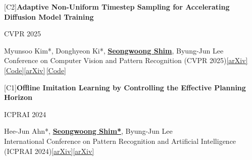 \documentclass[10.5pt,a4paper]{article}
\newcommand{\entry}[2]{%
  \noindent
  \begin{minipage}[t]{0.765\textwidth}\raggedright\strut #1\strut\end{minipage}%
  \hfill
  \begin{minipage}[t]{0.215\textwidth}\raggedleft\strut{\small\sffamily\color{muted}#2}\strut\end{minipage}%
  \par\vspace{1pt}}
\newcommand{\note}[1]{{\small\color{muted}#1}\par\vspace{9pt}}
\newcommand{\subline}[1]{{\small\color{muted}--- #1}\par}
\newcommand{\me}[1]{\underline{\textbf{#1}}}
\newcommand{\paperlink}[2]{\href{#2}{\small\color{muted}[#1]}}
\newcommand{\cvpub}[6]{%
  \entry{{\small\color{muted}[#1]}\quad\textbf{#2}}{#5}
  \note{#3\\ #4\ifx\relax#6\relax\else\quad#6\fi}}
\begin{document}
\cvpub{C2}
  {Adaptive Non-Uniform Timestep Sampling for Accelerating Diffusion Model Training}
  {Myunsoo Kim*, Donghyeon Ki*, \me{Seongwoong Shim}, Byung-Jun Lee}
  {Conference on Computer Vision and Pattern Recognition (CVPR 2025)}
  {CVPR 2025}
  {\paperlink{arXiv}{https://arxiv.org/abs/2411.09998}\,\paperlink{Code}{https://github.com/ku-dmlab/Adaptive-Timestep-Sampler}}

\cvpub{C1}
  {Offline Imitation Learning by Controlling the Effective Planning Horizon}
  {Hee-Jun Ahn*, \me{Seongwoong Shim*}, Byung-Jun Lee}
  {International Conference on Pattern Recognition and Artificial Intelligence (ICPRAI 2024)}
  {ICPRAI 2024}
  {\paperlink{arXiv}{https://arxiv.org/abs/2401.09728}}

%
%
\end{document}
